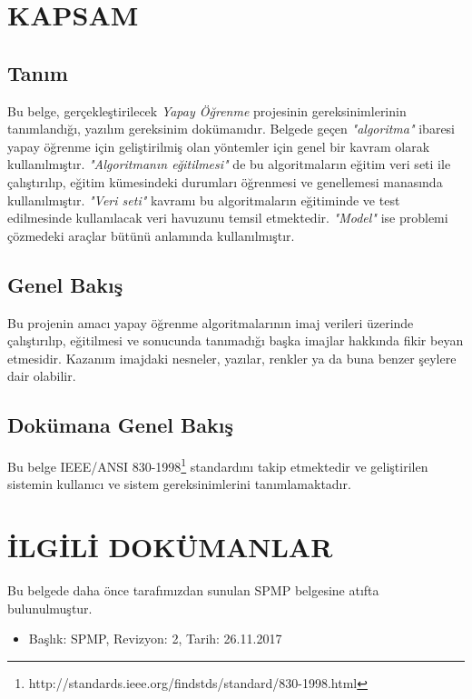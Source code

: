 \documentclass[12pt,a4paper]{article}
\begin{document}
   
   \newpage

   \tableofcontents
   \newpage


   \section{KAPSAM}
   \subsection{Tanım} \label{kaps}
   Bu belge, gerçekleştirilecek \textit{Yapay Öğrenme} projesinin gereksinimlerinin tanımlandığı, yazılım gereksinim dokümanıdır. Belgede geçen \textit{"algoritma"} ibaresi yapay öğrenme için geliştirilmiş olan yöntemler için genel bir kavram olarak kullanılmıştır. \textit{"Algoritmanın eğitilmesi"} de bu algoritmaların eğitim veri seti ile çalıştırılıp, eğitim kümesindeki durumları öğrenmesi ve genellemesi manasında kullanılmıştır. \textit{"Veri seti"} kavramı bu algoritmaların eğitiminde ve test edilmesinde kullanılacak veri havuzunu temsil etmektedir. \textit{"Model"} ise problemi çözmedeki araçlar bütünü anlamında kullanılmıştır.

   \subsection{Genel Bakış} \label{genel}
   Bu projenin amacı yapay öğrenme algoritmalarının imaj verileri üzerinde çalıştırılıp, eğitilmesi ve sonucunda tanımadığı başka imajlar hakkında fikir beyan etmesidir. Kazanım imajdaki nesneler, yazılar, renkler ya da buna benzer şeylere dair olabilir.

   \subsection{Dokümana Genel Bakış}
   Bu belge IEEE/ANSI 830-1998\footnote{http://standards.ieee.org/findstds/standard/830-1998.html} standardını takip etmektedir ve geliştirilen sistemin kullanıcı ve sistem gereksinimlerini tanımlamaktadır.

   \section{İLGİLİ DOKÜMANLAR}
   Bu belgede daha önce tarafımızdan sunulan SPMP belgesine atıfta bulunulmuştur.
   \begin{itemize}
      \item Başlık: SPMP, Revizyon: 2, Tarih: 26.11.2017
   \end{itemize}
\end{document}
